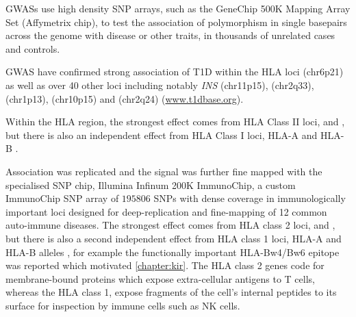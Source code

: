 
\Glspl{GWAS} use high density \gls{SNP} arrays, such as the GeneChip 500K Mapping Array Set (Affymetrix chip),
to test the association of polymorphism in single basepairs across the genome with disease or other traits,
in thousands of unrelated cases and controls.

\Gls{GWAS} have confirmed strong association of T1D within the \Gls{HLA} loci (chr6p21) as well as over 40 other loci including notably \emph{INS} (chr11p15),
 (chr2q33),  (chr1p13),  (chr10p15) and  (chr2q24) \citep{Burton:2007hta,Barrett:2009jq} (\url{www.t1dbase.org}).

Within the HLA region, the strongest effect comes from HLA Class II loci,  and ,
but there is also an independent effect from HLA Class I loci, HLA-A and HLA-B \citep{Howson:2009bl}.





Association was replicated and the signal was further fine mapped with the specialised SNP chip, Illumina Infinum 200K ImmunoChip, a custom ImmunoChip SNP array
of $195806$ SNPs with dense coverage in immunologically important loci designed for deep-replication and fine-mapping of 12 common auto-immune diseases.
The strongest effect comes from HLA class 2 loci,  and , but there is also a second independent effect from HLA class 1 loci,
HLA-A and HLA-B alleles \citep{Todd:2010bl},
for example the functionally important HLA-Bw4/Bw6 epitope \citep{Nejentsev:2007dv} was reported which motivated \cref{chapter:kir}.
The HLA class 2 genes code for membrane-bound proteins which expose extra-cellular antigens to T cells,
whereas the HLA class 1, expose fragments of the cell's internal peptides to its surface for inspection by immune cells such as \gls{NK} cells.

